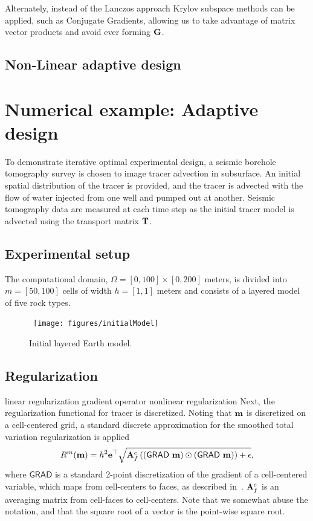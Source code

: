 \documentclass[12pt]{article}
\newcommand {\bfe}   { {\bf e} }
\newcommand {\bfm}   { {\bf m} }
\newcommand {\bfA}  { {\bf A} }
\newcommand{\bG}  { {\bf G} }      %
\newcommand{\bT}  {\text{\bf T}} %
\newcommand{\GRADh}  {{\textsf{GRAD}}} %
\begin{document}
Alternately, instead of the Lanczos approach Krylov subspace methods can be applied, such as  Conjugate Gradients, allowing us to take advantage of matrix vector products and avoid ever forming $\bG$. 
\subsection{Non-Linear adaptive design}
 
 
 \newpage
\section{Numerical example: Adaptive design} %
To demonstrate  iterative optimal experimental design, a seismic borehole tomography survey is chosen to image tracer advection in subsurface. 
An initial spatial distribution of the tracer is provided, and the tracer is advected with the flow of water injected from one well and pumped out at another. Seismic tomography data are measured at each time step as the initial tracer model is advected using the transport matrix $\bT$. 

\subsection{Experimental setup}
The computational domain, $\Omega=[0, 100] \times [0, 200]$ meters, is divided into $m=[50, 100]$ cells of width $h=[1,1]$ meters and consists of a layered model of five rock types.
%
%
\begin{figure}[h!]
\begin{center}
\	\texttt{[image: figures/initialModel]}
\end{center}
\caption{Initial layered Earth model.}
\end{figure}




\subsection{Regularization}
linear regularization gradient operator
nonlinear regularization
Next, the regularization functional  for tracer is discretized. 
Noting that $\bfm$ is discretized on a cell-centered grid, a standard discrete 
approximation for the smoothed total variation regularization is applied~\cite{ahh}
\begin{equation}
\label{eq:nonLinReg}
R^{m}(\bfm) = h^2 \bfe^{\top} \sqrt{ \bfA_{f}^{c} \left( (\GRADh\ \bfm) \odot (\GRADh\ \bfm) \right)  + \epsilon},
\end{equation}
where $\GRADh$ is a standard 2-point discretization of the gradient of a cell-centered variable, which maps from cell-centers to faces, as described in~\cite{ha,ahh}.
$\bfA_{f}^{c}$ is an averaging matrix from cell-faces to cell-centers.
Note that we somewhat abuse the notation, and that the square root of a vector is the point-wise square root.
\end{document}
